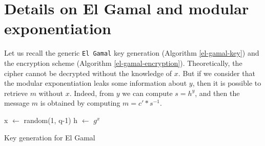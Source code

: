 \documentclass[journal]{IEEEtran}
\begin{document}
\clearpage




%


\appendices
\section{Details on El Gamal and modular exponentiation}
\label{ElGamal}
Let us recall the generic {\tt El Gamal} key generation (Algorithm \ref{el-gamal-key})
and the encryption scheme (Algorithm \ref{el-gamal-encryption}).
Theoretically, the cipher cannot be decrypted without the knowledge of $x$. But if we consider that
the modular exponentiation leaks some information about $y$, then it is possible to retrieve $m$ without $x$.
Indeed, from $y$ we can compute $s = h^y$, and then the message $m$ is obtained by computing $m = c' * s^{-1}$.


\begin{algorithm}
    \SetAlgoLined %
   
    \SetSideCommentLeft 
    \SetNoFillComment

    
    
    x $\leftarrow$ random(1, q-1)\;
    h $\leftarrow$ $g^x$\;


    \bigskip

    \caption{Key generation for El Gamal}
    \label{el-gamal-key}

\end{algorithm}
\end{document}
